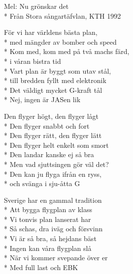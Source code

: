 \begin{SongText}
    \begin{SongInfo}
        Mel: Nu grönskar det\\*%
        Från Stora sångartäfvlan, KTH 1992
    \end{SongInfo}
    \begin{Verse}
        För vi har världens bästa plan,\\*%
        med mängder av bomber och speed\\*%
        Kom med, kom med på två machs färd,\\*%
        i våran bistra tid\\*%
        Vart plan är byggt som utav stål,\\*%
        till bredden fyllt med elektronik\\*%
        Det väldigt mycket G-kraft tål\\*%
        Nej, ingen är JASen lik
    \end{Verse}
    \begin{Verse}
        Den flyger högt, den flyger lågt\\*%
        Den flyger snabbt och fort\\*%
        Den flyger rätt, den flyger lätt\\*%
        Den flyger helt enkelt som smort\\*%
        Den landar kanske ej så bra\\*%
        Men vad sjuttsingen gör väl det?\\*%
        Den kan ju flyga ifrån en ryss,\\*%
        och svänga i sju-åtta G
    \end{Verse}
    \begin{Verse}
        Sverige har en gammal tradition\\*%
        Att bygga flygplan av klass\\*%
        Vi tonvis plan lanserat har\\*%
        Så schas, dra iväg och försvinn\\*%
        Vi är så bra, så hejdans bäst\\*%
        Ingen kan våra flygplan slå\\*%
        När vi kommer svepande över er\\*%
        Med full last och EBK
    \end{Verse}
\end{SongText}



\newpage